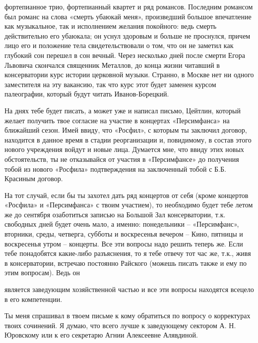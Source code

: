 
\noindent
фортепианное трио, фортепианный квартет и ряд романсов. Последним романсом был
романс на слова «смерть убаюкай меня», произведший большое впечатление как
музыкальное, так и исполнением желания покойного: ведь смерть действительно его
убаюкала; он уснул здоровым и больше не проснулся, причем лицо его и положение
тела свидетельствовали о том, что он не заметил как глубокий сон перешел в сон
вечный. Через несколько дней после смерти Егора Львовича скончался священник
Металлов, до конца жизни читавший в консерватории курс истории церковной
музыки. Странно, в Москве нет ни одного заместителя на эту вакансию, так что
курс этот будет заменен курсом палеографии, который будут читать
Иванов-Борецкий.


На днях тебе будет писать, а может уже и написал письмо, Цейтлин, который
желает получить твое согласие на участие в концертах «Персимфанса» на ближайший
сезон. Имей ввиду, что «Росфил», с которым ты заключил договор, находится в
данное время в стадии реорганизации и, повидимому, в состав этого нового
учреждения войдут и новые лица. Думается мне, что ввиду этих новых
обстоятельств, ты не отказывайся от участия в «Персимфансе» до получения тобой
из нового «Росфила» подтверждения на заключенный тобой с Б.Б. Красиным договор.


На тот случай, если бы ты захотел дать ряд концертов от себя (кроме концертов
«Росфила» и «Персимфанса» с твоим участием), то необходимо будет тебе летом же
до сентября озаботиться записью на Большой Зал консерватории, т.к. свободных
дней будет очень мало, а именно: понедельники -- «Персимфанс», вторники, среды,
четверга, субботы и воскресенья вечером -- Кино, пятницы и воскресенья утром --
концерты. Все эти вопросы надо решить теперь же. Если тебе понадобятся
какие-либо разъяснения, то я тебе отвечу тот час же, т.к., живя в
консерватории, встречаю постоянно Райского (можешь писать также и ему по этим
вопросам). Ведь он


\noindent
является заведующим хозяйственной частью и все эти вопросы находятся всецело в
его компетенции.

Ты меня спрашивал в твоем письме к кому обратиться по вопросу о корректурах
твоих сочинений. Я думаю, что всего лучше к заведующему сектором А. Н. Юровскому
или к его секретарю Агнии Алексеевне Алявдиной.

